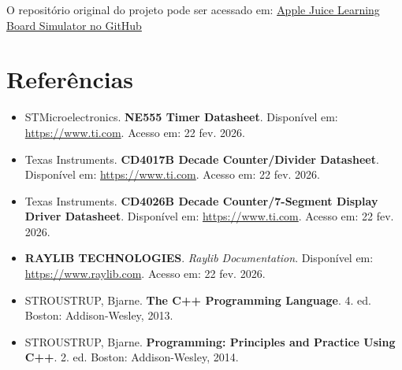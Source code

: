 \documentclass[12pt,a4paper]{article}
\begin{document}
O repositório original do projeto pode ser acessado em: 
\href{https://github.com/FrankSteps/Apple-juice-learning-board-simulator}{Apple Juice Learning Board Simulator no GitHub}

\newpage
\section{Referências}

\begin{itemize}
    \item STMicroelectronics. \textbf{NE555 Timer Datasheet}. Disponível em: \url{https://www.ti.com}. Acesso em: 22 fev. 2026.

    \item Texas Instruments. \textbf{CD4017B Decade Counter/Divider Datasheet}. Disponível em: \url{https://www.ti.com}. Acesso em: 22 fev. 2026.

    \item Texas Instruments. \textbf{CD4026B Decade Counter/7-Segment Display Driver Datasheet}. Disponível em: \url{https://www.ti.com}. Acesso em: 22 fev. 2026.

    \item \textbf{RAYLIB TECHNOLOGIES}. \textit{Raylib Documentation}. Disponível em: \url{https://www.raylib.com}. Acesso em: 22 fev. 2026.

    \item STROUSTRUP, Bjarne. \textbf{The C++ Programming Language}. 4. ed. Boston: Addison-Wesley, 2013.

    \item STROUSTRUP, Bjarne. \textbf{Programming: Principles and Practice Using C++}. 2. ed. Boston: Addison-Wesley, 2014.
\end{itemize}
\end{document}
